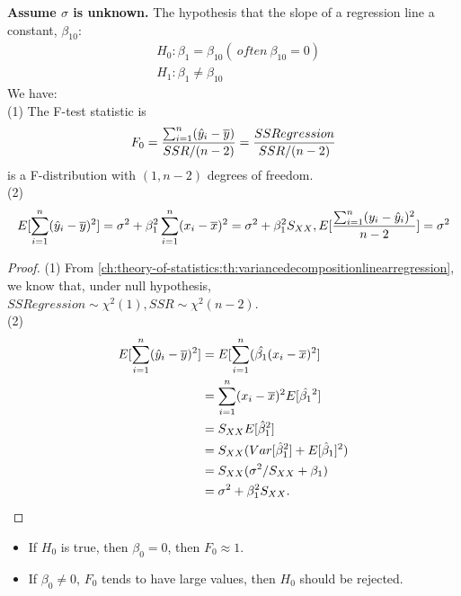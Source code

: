 \begin{refsection}
\begin{lemma}
	\textbf{Assume $\sigma$ is unknown.}	
	The hypothesis that the slope of a regression line a constant, $\beta_{10}$:
	\begin{align*}
	&H_0: \beta_1 = \beta_{10} (~often ~ \beta_{10} = 0)\\
	&H_1: \beta_1 \neq \beta_{10}
	\end{align*}
	We have:\\
	(1)
	The F-test statistic is
	$$F_0 = \frac{\sum_{i=1}^n (\hat{y}_i - \overline{y})}{SSR/(n-2)} = \frac{SSRegression}{SSR/(n-2)}$$
	is a F-distribution with $(1,n-2)$ degrees of freedom.\\
	(2)  $$E[\sum_{i=1}^n (\hat{y}_i - \overline{y})^2] = \sigma^2 + \beta_1^2 \sum_{i=1}^n (x_i - \overline{x})^2 = \sigma^2 + \beta_1^2S_{XX}, E[\frac{\sum_{i=1}^n (y_i - \hat{y}_i)^2}{n-2}]=\sigma^2$$
\end{lemma}
\begin{proof}
	(1) From \autoref{ch:theory-of-statistics:th:variancedecompositionlinearregression},  we know that, under null hypothesis,  $SSRegression \sim \chi^2(1), SSR\sim \chi^2(n-2)$. \\
	(2) 
	\begin{align*}
	E[\sum_{i=1}^n (\hat{y}_i - \overline{y})^2] &= E[\sum_{i=1}^n (\hat{\beta_1} (x_i - \overline{x})^2]\\
	&=\sum_{i=1}^n (x_i - \overline{x})^2E[\hat{\beta_1}^2] \\
	&= S_{XX} E[\hat{\beta}^2_1] \\
	&= S_{XX}(Var[\hat{\beta}_1^2] + E[\hat{\beta}_1]^2) \\
	&= S_{XX}(\sigma^2/S_{XX} + \beta_1) \\
	&= \sigma^2 + \beta_1^2S_{XX}.
	\end{align*}
	
\end{proof}

\begin{remark}\hfill
	\begin{itemize}
		\item If $H_0$ is true, then $\beta_0 = 0 $, then $F_0 \approx 1$.
		\item If $\beta_0 \neq 0$, $F_0$ tends to have large values, then $H_0$ should be rejected. 
	\end{itemize}
\end{remark}




\end{refsection}
